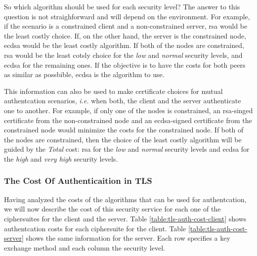 \documentclass{llncs}
\begin{document}
So which algorithm should be used for each security level? The answer to this question is not straighforward and will depend on the environment.
For example, if the scenario is a constrained client and a non-constrained server, \gls{rsa} would be the least costly choice. If, on the
other hand, the server is the constrained node, \gls{ecdsa} would be the least costly algorithm. If both of the nodes are
constrained, \gls{rsa} would be the least cotsly choice for the \textit{low} and \textit{normal} security levels, and \gls{ecdsa} for the remaining ones. 
If the objective is  to have the costs for both peers as similar as possbible, \gls{ecdsa} is the algorithm to use.

This information can also be used to make
certificate choices for mutual authentcation scenarios, \textit{i.e.} when both, the client and the server authenticate one to another.
For example, if only one of the nodes is constrained, an \gls{rsa}-singed certificate from the non-constrained node and an \gls{ecdsa}-signed
certificate from the constrained node would minimize the costs for the constrained node. If both of the nodes are constrained, then the
choice of the least costly algorithm will be guided by the \textit{Total} cost: \gls{rsa} for the \textit{low} and \textit{normal}
security levels and \gls{ecdsa} for the \textit{high} and \textit{very high} security levels.

\subsubsection{The Cost Of Authenticaition in TLS}

Having analyzed the costs of the algorithms that can be used for authentcation, we will now describe the cost of this security service
for each one of the ciphersuites for the client and the server. Table \ref{table:tls-auth-cost-client} shows authentcation costs for each
ciphersuite for the client. Table \ref{table:tls-auth-cost-server} shows the same information for the server. Each row specifies a key
exchange method and each column the security level.
\end{document}
